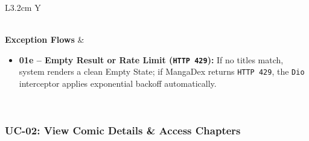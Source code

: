 \begin{table}[H]
\begin{tabularx}{\textwidth}{L{3.2cm} Y}
\begin{itemize}[nosep,leftmargin=1.4em]
\end{itemize} \\
\textbf{Exception Flows} &
\begin{itemize}[nosep,leftmargin=1.4em]
    \item \textbf{01e -- Empty Result or Rate Limit (\texttt{HTTP 429}):} If no titles match, system renders a clean Empty State; if MangaDex returns \texttt{HTTP 429}, the \texttt{Dio} interceptor applies exponential backoff automatically.
\end{itemize} \\
\bottomrule
\end{tabularx}
\end{table}

\subsubsection{UC-02: View Comic Details \& Access Chapters}
